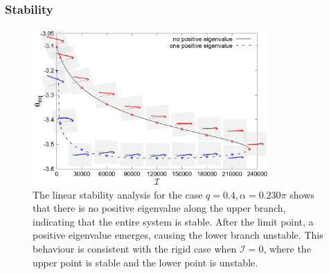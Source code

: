 \documentclass[lineno]{JFM-FLM_Au}
\begin{document}
\subsubsection{Stability}
\begin{figure}[!h]
	\begin{center}
		\includegraphics[width=0.8\textwidth]{plot/RESLT_q_0.40_alpha_0.230pi_plot_step_refine2_new_recale_FSI/combine_elastic_beam_I_theta_q_0.40_alpha_0.230pi_initial_-4.80_refine2_15_new_not_log_dash_line.png}
		\caption{The linear stability analysis for the case $q=0.4,\alpha=0.230\pi$ shows that there is no positive eigenvalue along the upper branch, indicating that the entire system is stable. After the limit point, a positive eigenvalue emerges, causing the lower branch unstable. This behaviour is consistent with the rigid case when $\mathcal{I}=0$, where the upper point is stable and the lower point is unstable.}
		\label{fig:10}
	\end{center}
\end{figure}
\end{document}
